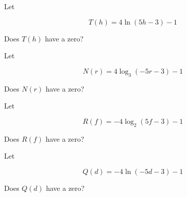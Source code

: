 \documentclass{ximera}
\author{Lee Wayand}
\begin{document}
\begin{exercise}


\begin{question}



Let 

\[
T(h) = 4 \ln(5h - 3) - 1
\]


Does $T(h)$ have a zero?


\begin{multipleChoice}
\end{multipleChoice}

\end{question}







\begin{question}



Let 

\[
N(r) = 4 \log_{3}(-5r - 3) - 1
\]


Does $N(r)$ have a zero?


\begin{multipleChoice}
\end{multipleChoice}

\end{question}





\begin{question}



Let 

\[
R(f) = -4 \log_{2}(5f - 3) - 1
\]


Does $R(f)$ have a zero?


\begin{multipleChoice}
\end{multipleChoice}

\end{question}








\begin{question}



Let 

\[
Q(d) = -4 \ln(-5d - 3) - 1
\]


Does $Q(d)$ have a zero?


\begin{multipleChoice}
\end{multipleChoice}

\end{question}








\end{exercise}
\end{document}
